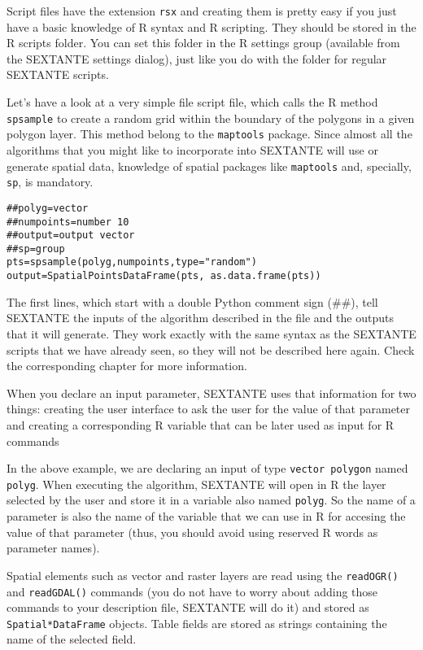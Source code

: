 Script files have the extension \texttt{rsx} and creating them is pretty easy if you just have a basic knowledge of R syntax and R scripting. They should be stored in the R scripts folder. You can set this folder in the R settings group (available from the SEXTANTE settings dialog), just like you do with the folder for regular SEXTANTE scripts. 

Let's have a look at a very simple file script file, which calls the R method \texttt{spsample} to create a random grid within the boundary of the polygons in a given polygon layer. This method belong to the \texttt{maptools} package. Since almost all the algorithms that you might like to incorporate into SEXTANTE will use or generate spatial data, knowledge of spatial packages like \texttt{maptools} and, specially, \texttt{sp}, is mandatory.

\begin{verbatim}
##polyg=vector
##numpoints=number 10
##output=output vector
##sp=group
pts=spsample(polyg,numpoints,type="random")
output=SpatialPointsDataFrame(pts, as.data.frame(pts))
\end{verbatim}


The first lines, which start with a double Python comment sign (\#\#), tell SEXTANTE the inputs of the algorithm described in the file and the outputs that it will generate. They work exactly with the same syntax as the SEXTANTE scripts that we have already seen, so they will not be described here again. Check the corresponding chapter for more information.

When you declare an input parameter, SEXTANTE uses that information for two things: creating the user interface to ask the user for the value of that parameter and creating a corresponding R variable that can be later used as input for R commands

In the above example, we are declaring an input of type \texttt{vector polygon} named \texttt{polyg}. When executing the algorithm, SEXTANTE will open in R the layer selected by the user and store it in a variable also named \texttt{polyg}. So the name of a parameter is also the name of the variable that we can use in R for accesing the value of that parameter (thus, you should avoid using reserved R words as parameter names).

Spatial elements such as vector and raster layers are read using the \texttt{readOGR()} and \texttt{readGDAL()} commands (you do not have to worry about adding those commands to your description file, SEXTANTE will do it) and stored as \texttt{Spatial*DataFrame} objects. Table fields are stored as strings containing the name of the selected field.

